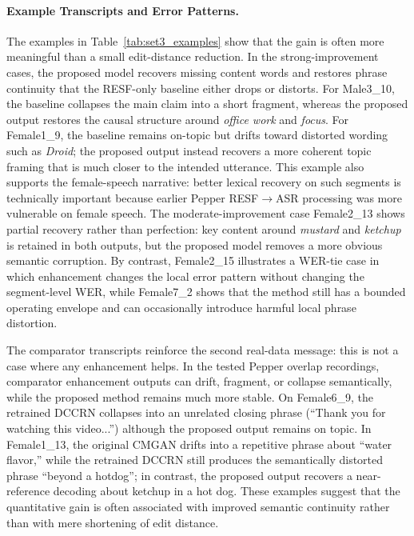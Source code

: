 \documentclass[manuscript,screen,review]{acmart}
\begin{document}
\paragraph{Example Transcripts and Error Patterns.}
The examples in Table~\ref{tab:set3_examples} show that the gain is often more meaningful than a small edit-distance reduction. In the strong-improvement cases, the proposed model recovers missing content words and restores phrase continuity that the RESF-only baseline either drops or distorts. For Male3\_10, the baseline collapses the main claim into a short fragment, whereas the proposed output restores the causal structure around \emph{office work} and \emph{focus}. For Female1\_9, the baseline remains on-topic but drifts toward distorted wording such as \emph{Droid}; the proposed output instead recovers a more coherent topic framing that is much closer to the intended utterance. This example also supports the female-speech narrative: better lexical recovery on such segments is technically important because earlier Pepper RESF$\rightarrow$ASR processing was more vulnerable on female speech. The moderate-improvement case Female2\_13 shows partial recovery rather than perfection: key content around \emph{mustard} and \emph{ketchup} is retained in both outputs, but the proposed model removes a more obvious semantic corruption. By contrast, Female2\_15 illustrates a WER-tie case in which enhancement changes the local error pattern without changing the segment-level WER, while Female7\_2 shows that the method still has a bounded operating envelope and can occasionally introduce harmful local phrase distortion.

The comparator transcripts reinforce the second real-data message: this is not a case where any enhancement helps. In the tested Pepper overlap recordings, comparator enhancement outputs can drift, fragment, or collapse semantically, while the proposed method remains much more stable. On Female6\_9, the retrained DCCRN collapses into an unrelated closing phrase (``Thank you for watching this video...'') although the proposed output remains on topic. In Female1\_13, the original CMGAN drifts into a repetitive phrase about ``water flavor,'' while the retrained DCCRN still produces the semantically distorted phrase ``beyond a hotdog''; in contrast, the proposed output recovers a near-reference decoding about ketchup in a hot dog. These examples suggest that the quantitative gain is often associated with improved semantic continuity rather than with mere shortening of edit distance.
\end{document}
